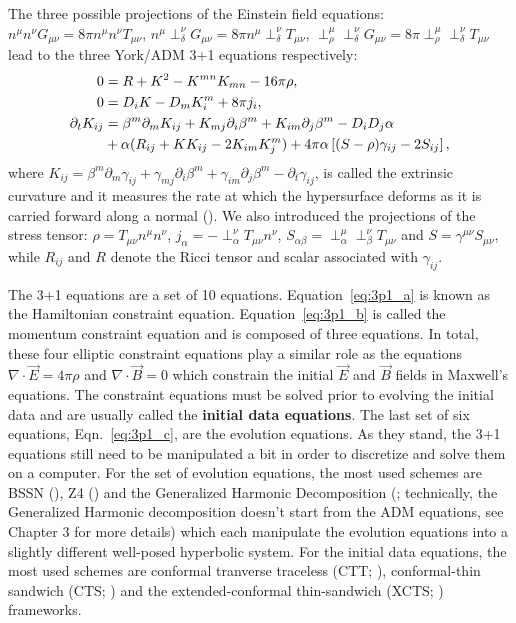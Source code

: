 The three possible projections of the Einstein field equations: $n^{\mu} n^{\nu} G_{\mu\nu} = 8\pi n^{\mu} n^{\nu} T_{\mu\nu}$, $n^{\mu}\perp^{\nu}_{\delta}G_{\mu\nu} = 8\pi n^{\mu} \perp^{\nu}_{\delta} T_{\mu\nu}$, $\perp^{\mu}_{\rho} \perp^{\nu}_{\delta} G_{\mu\nu} = 8\pi \perp^{\mu}_{\rho} \perp^{\nu}_{\delta} T_{\mu\nu}$ lead to the three York/ADM 3+1 equations respectively:
%
\begin{align}
0 &= R + K^{2} - K^{mn}K_{mn} -16\pi\rho,\label{eq:3p1_a} \\
0 &= D_iK - D_mK^m_i + 8\pi j_i,\label{eq:3p1_b} \\
\partial_t K_{ij} &= \beta^m\partial_mK_{ij} + K_{mj}\partial_i\beta^m + K_{im}\partial_j\beta^m - D_iD_j\alpha \label{eq:3p1_c}\\ 
&+ \alpha(R_{ij}+KK_{ij}-2K_{im}K^m_{j})+4\pi\alpha\left[(S-\rho)\gamma_{ij}-2S_{ij}\right]\notag,
\end{align}
where $K_{ij} = \beta^m\partial_m\gamma_{ij} + \gamma_{mj}\partial_{i}\beta^{m} + \gamma_{im}\partial_j\beta^{m}-\partial_{t}\gamma_{ij}$, is called the extrinsic curvature and it measures
the rate at which the hypersurface deforms as it is carried forward along a normal (\cite{baumgarte2010numerical}). We also introduced the projections of the stress tensor: $\rho = T_{\mu\nu} n^{\mu} n^{\nu}$, $j_{\alpha}= -\perp^{\nu}_{\alpha} T_{\mu\nu} n^{\nu}$, $S_{\alpha\beta} = \perp^{\mu}_{\alpha} \perp^{\nu}_{\beta} T_{\mu\nu}$ and $S=\gamma^{\mu\nu} S_{\mu\nu}$, while $R_{ij}$ and $R$ denote the Ricci tensor and scalar associated with $\gamma_{ij}$.

The 3+1 equations are a set of 10 equations. Equation~\ref{eq:3p1_a} is known as the Hamiltonian constraint equation. Equation~\ref{eq:3p1_b} is called the momentum constraint equation and is composed of three equations. In total, these four elliptic constraint equations play a similar role as the equations $\nabla \cdot \vec E = 4\pi\rho$ and $\nabla \cdot \vec B = 0$ which constrain the initial $\vec E$ and $\vec B$ fields in Maxwell's equations. The constraint equations must be solved prior to evolving the initial data and are usually called the \textbf{initial data equations}. The last set of six equations, Eqn.~\ref{eq:3p1_c}, are the evolution equations. As they stand, the 3+1 equations still need to be manipulated a bit in order to discretize and solve them on a computer. For the set of evolution equations, the most used schemes are BSSN (\cite{baumgarte1998numerical,shibata1995evolution}), Z4 (\cite{bona2003general}) and the Generalized Harmonic Decomposition (\cite{pretorius2005numerical}; technically, the Generalized Harmonic decomposition doesn't start from the ADM equations, see Chapter 3 for more details) which each manipulate the evolution equations into a slightly different well-posed hyperbolic system. For the initial data equations, the most used schemes are conformal tranverse traceless (CTT; \cite{bowen1980time}), conformal-thin sandwich (CTS; \cite{york1999conformal}) and the extended-conformal thin-sandwich (XCTS; \cite{pfeiffer-york:2005}) frameworks.

